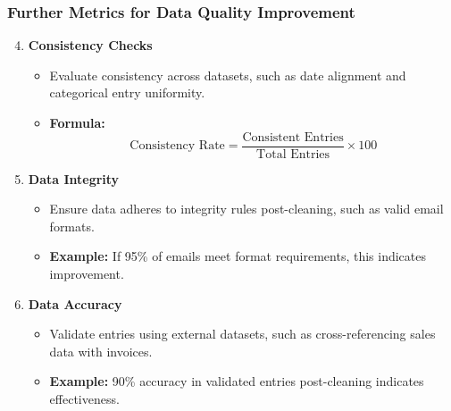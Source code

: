\documentclass[aspectratio=169]{beamer}
\begin{document}
\begin{frame}[fragile]
    \frametitle{Further Metrics for Data Quality Improvement}
    \begin{enumerate}
        \setcounter{enumi}{3} %
        \item \textbf{Consistency Checks}
            \begin{itemize}
                \item Evaluate consistency across datasets, such as date alignment and categorical entry uniformity.
                \item \textbf{Formula:}
                \begin{equation}
                    \text{Consistency Rate} = \frac{\text{Consistent Entries}}{\text{Total Entries}} \times 100
                \end{equation}
            \end{itemize}

        \item \textbf{Data Integrity}
            \begin{itemize}
                \item Ensure data adheres to integrity rules post-cleaning, such as valid email formats.
                \item \textbf{Example:} If 95\% of emails meet format requirements, this indicates improvement.
            \end{itemize}

        \item \textbf{Data Accuracy}
            \begin{itemize}
                \item Validate entries using external datasets, such as cross-referencing sales data with invoices.
                \item \textbf{Example:} 90\% accuracy in validated entries post-cleaning indicates effectiveness.
            \end{itemize}
    \end{enumerate}
\end{frame}
\end{document}
